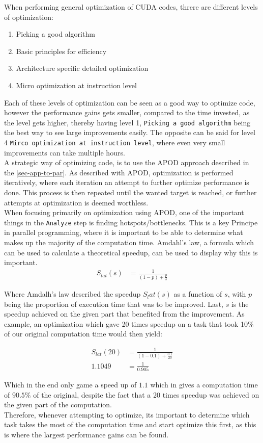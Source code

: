 When performing general optimization of CUDA codes, threre are different levels of optimization:
\begin{enumerate}
	\item Picking a good algorithm
	\item Basic principles for efficiency
	\item Architecture specific detailed optimization
	\item Micro optimization at instruction level
\end{enumerate}

Each of these levels of optimization can be seen as a good way to optimize code, however the performance gains gets smaller, compared to the time invested, as the level gets higher, thereby having level 1, \texttt{Picking a good algorithm} being the best way to see large improvements easily. The opposite can be said for level 4 \texttt{Mirco optimization at instruction level}, where even very small improvements can take multiple hours.\\

A strategic way of optimizing code, is to use the APOD approach described in the \cref{sec-app-to-par}. As described with APOD, optimization is performed iteratively, where each iteration an attempt to further optimize performance is done. This process is then repeated until the wanted target is reached, or further attempts at optimization is deemed worthless.\\
When focusing primarily on optimization using APOD, one of the important things in the \texttt{Analyze} step is finding hotspots/bottlenecks. This is a key Principe in parallel programming, where it is important to be able to determine what makes up the majority of the computation time. Amdahl's law, a formula which can be used to calculate a theoretical speedup, can be used to display why this is important.\\
\begin{align*}
	S_{lat}(s) &= \frac{1}{(1-p)+\frac{p}{s}}
\end{align*}

Where Amdalh's law described the speedup $S_lat(s)$ as a function of $s$, with $p$ being the proportion of execution time that was to be improved. Last, $s$ is the speedup achieved on the given part that benefited from the improvement. As example, an optimization which gave 20 times speedup on a task that took 10\% of our original computation time would then yield:

 \begin{align*}
 S_{lat}(20) &= \frac{1}{(1-0.1)+\frac{0.1}{20}}\\
 1.1049 &= \frac{1}{0.905}
 \end{align*}
 
 Which in the end only game a speed up of $1.1$ which in gives a computation time of $90.5\%$ of the original, despite the fact that a 20 times speedup was achieved on the given part of the computation.\\
 Therefore, whenever attempting to optimize, its important to determine which task takes the most of the computation time and start optimize this first, as this is where the largest performance gains can be found. 